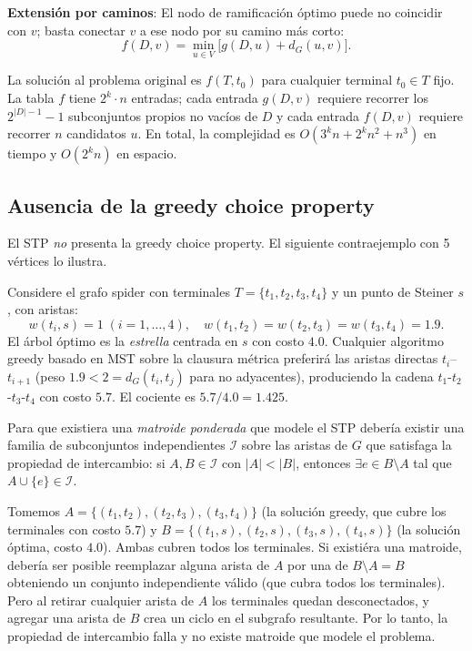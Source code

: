 \documentclass[11pt]{article}
\begin{document}
\noindent\textbf{Extensi\'on por caminos}:
El nodo de ramificaci\'on \'optimo puede no coincidir con $v$; basta conectar
$v$ a ese nodo por su camino m\'as corto:
\begin{equation}
  f(D, v) = \min_{u \in V} \bigl[g(D, u) + d_G(u, v)\bigr]. \label{eq:f_rec}
\end{equation}

La soluci\'on al problema original es $f(T, t_0)$ para cualquier terminal
$t_0\in T$ fijo.  La tabla $f$ tiene $2^k\cdot n$ entradas; cada entrada
$g(D,v)$ requiere recorrer los $2^{|D|-1}-1$ subconjuntos propios no vac\'ios
de $D$ y cada entrada $f(D,v)$ requiere recorrer $n$ candidatos $u$.  En total,
la complejidad es $O(3^k n + 2^k n^2 + n^3)$ en tiempo y $O(2^k n)$ en espacio.

\subsection{Ausencia de la greedy choice property}\label{sec:no-greedy}

El STP \emph{no} presenta la greedy choice property.  El siguiente contraejemplo
con 5 v\'ertices lo ilustra.

Considere el grafo \textsf{spider} con terminales $T=\{t_1,t_2,t_3,t_4\}$ y un
punto de Steiner $s$, con aristas:
\[
  w(t_i, s) = 1 \; (i=1,\ldots,4),
  \quad
  w(t_1,t_2) = w(t_2,t_3) = w(t_3,t_4) = 1.9.
\]
El \'arbol \'optimo es la \emph{estrella} centrada en $s$ con costo $4.0$.
Cualquier algoritmo greedy basado en MST sobre la clausura m\'etrica preferir\'a
las aristas directas $t_i$--$t_{i+1}$ (peso $1.9 < 2 = d_G(t_i, t_j)$ para
no adyacentes), produciendo la cadena $t_1$-$t_2$-$t_3$-$t_4$ con costo $5.7$.
El cociente es $5.7/4.0 = 1.425$.

Para que existiera una \emph{matroide ponderada} que modele el STP deber\'ia
existir una familia de subconjuntos independientes $\mathcal{I}$ sobre las
aristas de $G$ que satisfaga la propiedad de intercambio: si
$A,B\in\mathcal{I}$ con $|A|<|B|$, entonces $\exists e\in B\setminus A$ tal
que $A\cup\{e\}\in\mathcal{I}$.

Tomemos $A = \{(t_1,t_2),(t_2,t_3),(t_3,t_4)\}$ (la soluci\'on greedy, que cubre
los terminales con costo $5.7$) y $B = \{(t_1,s),(t_2,s),(t_3,s),(t_4,s)\}$
(la soluci\'on \'optima, costo $4.0$).  Ambas cubren todos los terminales.
Si existi\'era una matroide, deber\'ia ser posible reemplazar alguna arista de
$A$ por una de $B\setminus A=B$ obteniendo un conjunto independiente v\'alido
(que cubra todos los terminales).  Pero al retirar cualquier arista de $A$ los
terminales quedan desconectados, y agregar una arista de $B$ crea un ciclo en el
subgrafo resultante.  Por lo tanto, la propiedad de intercambio falla y no existe
matroide que modele el problema.
\end{document}
